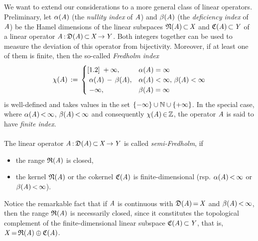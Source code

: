 \documentclass[11pt,twoside]{article}
\begin{document}
\subsection{} %
We want to extend our considerations
to a more general class of linear operators.
Preliminary,
let $\alpha(\mathit{A})$ (the \textit{nullity index} of $\mathit{A}$)
and $\beta(\mathit{A})$ (the \textit{deficiency index} of $\mathit{A}$)
be the Hamel dimensions of the linear subspaces
$\mathfrak{N}(\mathit{A}) {\,\subset\,} \mathit{X}$ and $\mathfrak{C}{(\mathit{A})} {\,\subset\,} \mathit{Y}$
of a linear operator $\mathit{A} {\,:\,} \mathfrak{D}(\mathit{A}) {\,\subset\,} \mathit{X} {\,\to\,} \mathit{Y}$.
Both integers together can be used
to measure the deviation of this operator from bijectivity.
Moreover,
if at least one of them is finite,
then the so-called \textit{Fredholm index}
\[
\chi(\mathit{A}) \,:=\,
\begin{cases}[1.2]
\; + \infty, & \alpha(\mathit{A}) = \infty\\
\; \alpha(\mathit{A}) \, - \, \beta(\mathit{A}), &
\alpha(\mathit{A}) < \infty, \, \beta(\mathit{A}) < \infty\\
\; - \infty, & \beta(\mathit{A}) = \infty\\
\end{cases}
\]
is well-defined and takes values in the set
$\{{-} \infty\} \cup {\mathbb{N}} \cup \{{+} \infty\}$.
In the special case,
where $\alpha(\mathit{A}) {\,<\,} \infty$,
$\beta(\mathit{A}) {\,<\,} \infty$
and consequently $\chi(\mathit{A}) {\,\in\,} {\mathbb{Z}}$,
the operator $\mathit{A}$ is said to have \textit{finite index}.

\paragraph{} %
The linear operator $\mathit{A} {\,:\,} \mathfrak{D}(\mathit{A}) {\,\subset\,} \mathit{X} {\,\to\,} \mathit{Y}$
is called \textit{semi-Fredholm},
if
\begin{itemize}[leftmargin=12mm]
\item[(F-1)] the range $\mathfrak{R}(\mathit{A})$ is closed,
\item[(F-2)] the kernel $\mathfrak{N}(\mathit{A}) $ or the cokernel $\mathfrak{C}{(\mathit{A})} $
             is finite-dimensional
             (rsp. $\alpha(\mathit{A}) {\,<\,} \infty$ or
                   $\beta(\mathit{A})  {\,<\,} \infty$).
\end{itemize}

Notice the remarkable fact
that if $\mathit{A}$ is continuous with $\mathfrak{D}(\mathit{A}) {\,=\,} \mathit{X}$
and $\beta(\mathit{A}) {\,<\,} \infty$,
then the range $\mathfrak{R}(\mathit{A})$ is necessarily closed,
since it constitutes the topological complement
of the finite-dimensional linear subspace $\mathfrak{C}{(\mathit{A})} {\,\subset\,} \mathit{Y}$,
that is,
$\mathit{X} {\,=\,} \mathfrak{R}(\mathit{A}) \oplus \mathfrak{C}{(\mathit{A})}$.
\end{document}
